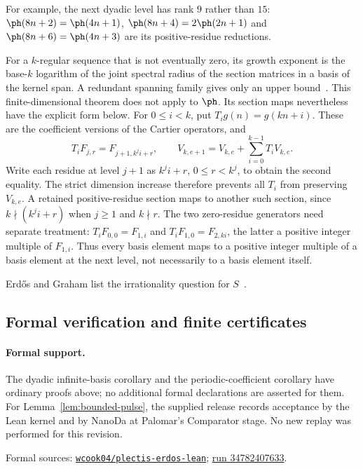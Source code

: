 \documentclass[11pt]{article}
\begin{document}
For example, the next dyadic level has rank $9$ rather than $15$:
$\ph(8n+2)=\ph(4n+1)$, $\ph(8n+4)=2\ph(2n+1)$ and
$\ph(8n+6)=\ph(4n+3)$ are its positive-residue reductions.

For a $k$-regular sequence that is not eventually zero, its growth
exponent is the base-$k$ logarithm of the joint spectral radius of the
section matrices in a basis of the kernel span. A redundant spanning
family gives only an upper bound~\cite[Thm.~1, Prop.~4, Cor.~7]{coons-jsr}.
This finite-dimensional theorem does not apply to $\ph$. Its section
maps nevertheless have the explicit form below. For $0\le i<k$, put $T_i g(n)=g(kn+i)$. These are the
coefficient versions of the Cartier operators, and
\[
 T_iF_{j,r}=F_{j+1,k^ji+r},\qquad
 V_{k,e+1}=V_{k,e}+\sum_{i=0}^{k-1}T_iV_{k,e}.
\]
Write each residue at level $j+1$ as $k^ji+r$, $0\le r<k^j$, to
obtain the second equality. The strict dimension increase therefore
prevents all $T_i$ from preserving $V_{k,e}$. A retained positive-residue
section maps to another such section, since $k\nmid(k^ji+r)$ when
$j\ge1$ and $k\nmid r$.
The two zero-residue generators need separate treatment:
$T_iF_{0,0}=F_{1,i}$ and $T_iF_{1,0}=F_{2,ki}$, the latter a positive
integer multiple of $F_{1,i}$. Thus every basis element maps to a positive
integer multiple of a basis element at the next level, not necessarily
to a basis element itself.

Erd\H{o}s and Graham list the irrationality question for $S$~\cite[p.~61]{erdosgraham1980}.

\subsection*{Formal verification and finite certificates}
\paragraph{Formal support.}
The dyadic infinite-basis corollary and the periodic-coefficient corollary
have ordinary proofs above; no additional formal declarations are asserted
for them. For Lemma~\ref{lem:bounded-pulse}, the supplied release records
acceptance by the Lean kernel and by NanoDa at Palomar's Comparator stage.
No new replay was performed for this revision.

\noindent Formal sources: \href{https://github.com/wcook04/plectis-erdos-lean/blob/52f29ad173b04e3bac941b3663f2b9aebe5de0bb/PalomarCorpus/E249/Challenge.lean#L572}{\texttt{wcook04/plectis-erdos-lean}};
\href{https://github.com/wcook04/plectis-erdos-lean/actions/runs/34782407633}{run 34782407633}.
\end{document}
